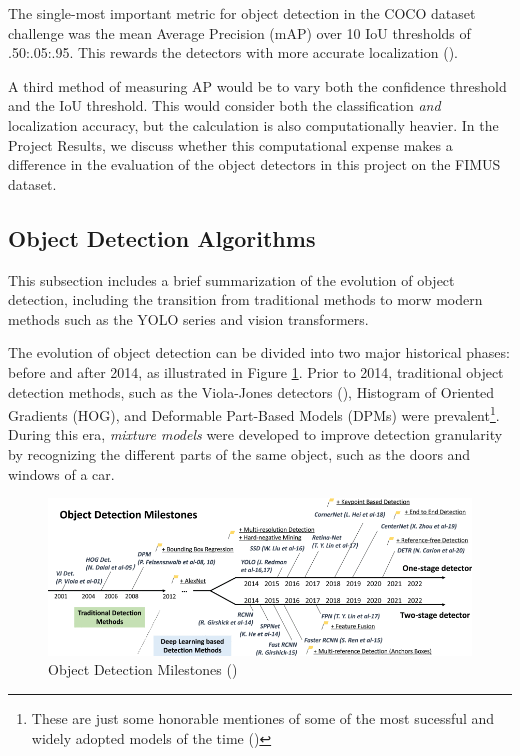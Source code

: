 The single-most important metric for object detection in the COCO dataset challenge was the mean Average Precision (mAP) over 10 IoU thresholds of .50:.05:.95. This rewards the detectors with more accurate localization (\cite{li2014cocodataset}).

A third method of measuring AP would be to vary both the confidence threshold and the IoU threshold. This would consider both the classification \textit{and} localization accuracy, but the calculation is also computationally heavier. In the Project Results, we discuss whether this computational expense makes a difference in the evaluation of the object detectors in this project on the FIMUS dataset.

\subsection{Object Detection Algorithms}
\label{sec:object_detection}
This subsection includes a brief summarization of the evolution of object detection, including the transition from traditional methods to morw modern methods such as the YOLO series and vision transformers.

The evolution of object detection can be divided into two major historical phases: before and after 2014, as illustrated in Figure \ref{fig:object_detect_20_years}. Prior to 2014, traditional object detection methods, such as the Viola-Jones detectors (\cite{vi2001viola-jones-orig}), Histogram of Oriented Gradients (HOG), and Deformable Part-Based Models (DPMs) were prevalent\footnote{These are just some honorable mentiones of some of the most sucessful and widely adopted models of the time (\cite{li2012violajonessuccessful})}. During this era, \textit{mixture models} were developed to improve detection granularity by recognizing the different parts of the same object, such as the doors and windows of a car.

\begin{figure}[H]
    \centering
    \includegraphics[width=1\linewidth]{Images/Diagrams/object_detection_20years.png}
    \caption{\centering Object Detection Milestones (\cite{zou2023object_detection_in_20_years})}
    \label{fig:object_detect_20_years}
\end{figure}

